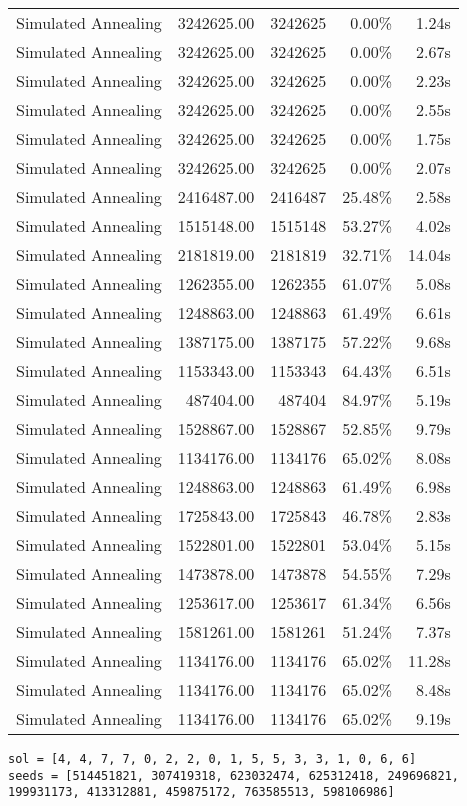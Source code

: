 \begin{table}[ht]
\begin{tabular}{|r|r|r|r|r|}
Simulated Annealing & 3242625.00 & 3242625 & 0.00\% & 1.24s\\
Simulated Annealing & 3242625.00 & 3242625 & 0.00\% & 2.67s\\
Simulated Annealing & 3242625.00 & 3242625 & 0.00\% & 2.23s\\
Simulated Annealing & 3242625.00 & 3242625 & 0.00\% & 2.55s\\
Simulated Annealing & 3242625.00 & 3242625 & 0.00\% & 1.75s\\
Simulated Annealing & 3242625.00 & 3242625 & 0.00\% & 2.07s\\
Simulated Annealing & 2416487.00 & 2416487 & 25.48\% & 2.58s\\
Simulated Annealing & 1515148.00 & 1515148 & 53.27\% & 4.02s\\
Simulated Annealing & 2181819.00 & 2181819 & 32.71\% & 14.04s\\
Simulated Annealing & 1262355.00 & 1262355 & 61.07\% & 5.08s\\
Simulated Annealing & 1248863.00 & 1248863 & 61.49\% & 6.61s\\
Simulated Annealing & 1387175.00 & 1387175 & 57.22\% & 9.68s\\
Simulated Annealing & 1153343.00 & 1153343 & 64.43\% & 6.51s\\
Simulated Annealing & 487404.00 & 487404 & 84.97\% & 5.19s\\
Simulated Annealing & 1528867.00 & 1528867 & 52.85\% & 9.79s\\
Simulated Annealing & 1134176.00 & 1134176 & 65.02\% & 8.08s\\
Simulated Annealing & 1248863.00 & 1248863 & 61.49\% & 6.98s\\
Simulated Annealing & 1725843.00 & 1725843 & 46.78\% & 2.83s\\
Simulated Annealing & 1522801.00 & 1522801 & 53.04\% & 5.15s\\
Simulated Annealing & 1473878.00 & 1473878 & 54.55\% & 7.29s\\
Simulated Annealing & 1253617.00 & 1253617 & 61.34\% & 6.56s\\
Simulated Annealing & 1581261.00 & 1581261 & 51.24\% & 7.37s\\
Simulated Annealing & 1134176.00 & 1134176 & 65.02\% & 11.28s\\
Simulated Annealing & 1134176.00 & 1134176 & 65.02\% & 8.48s\\
Simulated Annealing & 1134176.00 & 1134176 & 65.02\% & 9.19s\\
\end{tabular}%
\end{table}
\begin{lstlisting}[label={lst:call7vehicle3},caption=Optimal solution call\_7\_vehicle\_3]
sol = [4, 4, 7, 7, 0, 2, 2, 0, 1, 5, 5, 3, 3, 1, 0, 6, 6]
seeds = [514451821, 307419318, 623032474, 625312418, 249696821, 199931173, 413312881, 459875172, 763585513, 598106986]
\end{lstlisting}%
\clearpage


